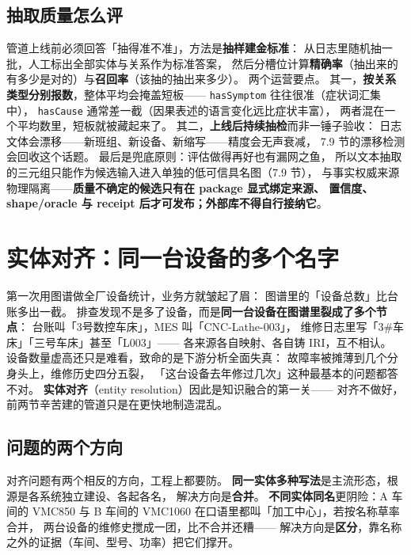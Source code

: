 \subsection{抽取质量怎么评}

管道上线前必须回答「抽得准不准」，方法是\textbf{抽样建金标准}：
从日志里随机抽一批，人工标出全部实体与关系作为标准答案，
然后分槽位计算\textbf{精确率}（抽出来的有多少是对的）与\textbf{召回率}（该抽的抽出来多少）。
两个运营要点。
其一，\textbf{按关系类型分别报数}，整体平均会掩盖短板——
\texttt{hasSymptom} 往往很准（症状词汇集中），
\texttt{hasCause} 通常差一截（因果表述的语言变化远比症状丰富），
两者混在一个平均数里，短板就被藏起来了。
其二，\textbf{上线后持续抽检}而非一锤子验收：
日志文体会漂移——新班组、新设备、新缩写——精度会无声衰减，
7.9 节的漂移检测会回收这个话题。
最后是兜底原则：评估做得再好也有漏网之鱼，
所以文本抽取的三元组只能作为候选输入进入单独的低可信具名图（7.9 节），
与事实权威来源物理隔离——\textbf{质量不确定的候选只有在 package 显式绑定来源、
置信度、shape/oracle 与 receipt 后才可发布；外部库不得自行接纳它}。

\section{实体对齐：同一台设备的多个名字}

第一次用图谱做全厂设备统计，业务方就皱起了眉：
图谱里的「设备总数」比台账多出一截。
排查发现不是多了设备，而是\textbf{同一台设备在图谱里裂成了多个节点}：
台账叫「3号数控车床」，MES 叫「CNC-Lathe-003」，
维修日志里写「3\#车床」「三号车床」甚至「L003」——
各来源各自映射、各自铸 IRI，互不相认。
设备数量虚高还只是难看，致命的是下游分析全面失真：
故障率被摊薄到几个分身头上，维修历史四分五裂，
「这台设备去年修过几次」这种最基本的问题都答不对。
\textbf{实体对齐}（entity resolution）因此是知识融合的第一关——
对齐不做好，前两节辛苦建的管道只是在更快地制造混乱。

\subsection{问题的两个方向}



对齐问题有两个相反的方向，工程上都要防。
\textbf{同一实体多种写法}是主流形态，根源是各系统独立建设、各起各名，
解决方向是\textbf{合并}。
\textbf{不同实体同名}更阴险：A 车间的 VMC850 与 B 车间的 VMC1060
在口语里都叫「加工中心」，若按名称草率合并，
两台设备的维修史搅成一团，比不合并还糟——
解决方向是\textbf{区分}，靠名称之外的证据（车间、型号、功率）把它们撑开。

